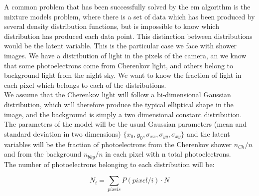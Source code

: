 \documentclass[main.tex]{subfiles}
\begin{document}
A common problem that has been successfully solved by the \gls{em} algorithm is the mixture models problem, where there is a set of data which has been produced by several density distribution functions, but is impossible to know which distribution has produced each data point. This distinction between distributions would be the latent variable. This is the particular case we face with shower images. We have a distribution of light in the pixels of the camera, an we know that some photoelectrons come from Cherenkov light, and others belong to background light from the night sky. We want to know the fraction of light in each pixel which belongs to each of the distributions.\\
We assume that the Cherenkov light will follow a bi-dimensional Gaussian distribution, which will therefore produce the typical elliptical shape in the image, and the background is simply a two dimensional constant distribution. The parameters of the model will be the usual Gaussian parameters (mean and standard deviation in two dimensions) $\{x_{0}, y_{0},\sigma_{xx}, \sigma_{yy}, \sigma_{xy}\}$ and the latent variables will be the fraction of photoelectrons from the Cherenkov shower $n_{Ch}/n$ and from the background $n_{bkg}/n$ in each pixel with n total photoelectrons.\\
The number of photoelectrons belonging to each distribution will be:

\begin{equation}
  N_{i} = \sum_{pixels} P(pixel/i)\cdot N
\end{equation}
\end{document}
